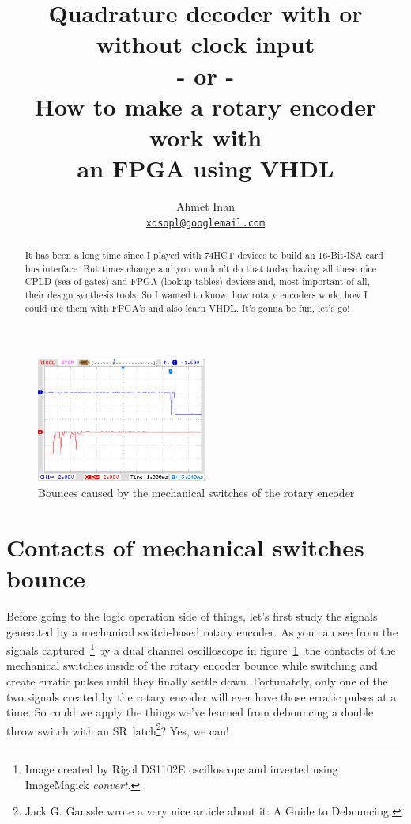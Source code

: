 \documentclass[a4paper]{article}
\title{Quadrature decoder with or without clock input\\- or -\\How to make a rotary encoder work with\\an FPGA using VHDL}
\author{Ahmet Inan\\\href{mailto:xdsopl@googlemail.com}{\nolinkurl{xdsopl@googlemail.com}}}
\begin{document}
\maketitle
\begin{abstract}
It has been a long time since I played with 74HCT devices to build an 16-Bit-ISA card bus interface.
But times change and you wouldn't do that today having all these nice CPLD (sea of gates) and FPGA (lookup tables) devices and, most important of all, their design synthesis tools.
So I wanted to know, how rotary encoders work, how I could use them with FPGA's and also learn VHDL.
It's gonna be fun, let's go!
\end{abstract}
\begin{figure}
\centering
\includegraphics[width=0.5\textwidth]{quadrature_decoder_rigol.png}
\caption{Bounces caused by the mechanical switches of the rotary encoder}
\label{fig:bounces}
\end{figure}
\section{Contacts of mechanical switches bounce}
Before going to the logic operation side of things, let's first study the signals generated by a mechanical switch-based rotary encoder.
As you can see from the signals captured~\footnote{Image created by Rigol DS1102E oscilloscope and inverted using ImageMagick \emph{convert}.}
by a dual channel oscilloscope in figure~\ref{fig:bounces},
the contacts of the mechanical switches inside of the rotary encoder bounce while switching and create erratic pulses until they finally settle down.
Fortunately, only one of the two signals created by the rotary encoder will ever have those erratic pulses at a time.
So could we apply the things we've learned from debouncing a double throw switch with an SR~latch\footnote{Jack G. Ganssle wrote a very nice article about it: A Guide to Debouncing.}?
Yes, we can!
\newpage
\end{document}

